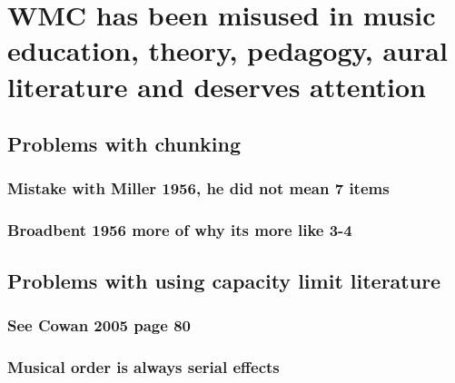 \documentclass[]{book}
\theoremstyle{definition}
\theoremstyle{definition}
\theoremstyle{definition}
\theoremstyle{remark}
\begin{document}
\hypertarget{wmc-has-been-misused-in-music-education-theory-pedagogy-aural-literature-and-deserves-attention}{%
\section{WMC has been misused in music education, theory, pedagogy,
aural literature and deserves
attention}\label{wmc-has-been-misused-in-music-education-theory-pedagogy-aural-literature-and-deserves-attention}}

\hypertarget{problems-with-chunking}{%
\subsection{Problems with chunking}\label{problems-with-chunking}}

\hypertarget{mistake-with-miller-1956-he-did-not-mean-7-items}{%
\subsubsection{Mistake with Miller 1956, he did not mean 7
items}\label{mistake-with-miller-1956-he-did-not-mean-7-items}}

\hypertarget{broadbent-1956-more-of-why-its-more-like-3-4}{%
\subsubsection{Broadbent 1956 more of why its more like
3-4}\label{broadbent-1956-more-of-why-its-more-like-3-4}}

\hypertarget{problems-with-using-capacity-limit-literature}{%
\subsection{Problems with using capacity limit
literature}\label{problems-with-using-capacity-limit-literature}}

\hypertarget{see-cowan-2005-page-80}{%
\subsubsection{See Cowan 2005 page 80}\label{see-cowan-2005-page-80}}

\hypertarget{musical-order-is-always-serial-effects}{%
\subsubsection{Musical order is always serial
effects}\label{musical-order-is-always-serial-effects}}
\end{document}
